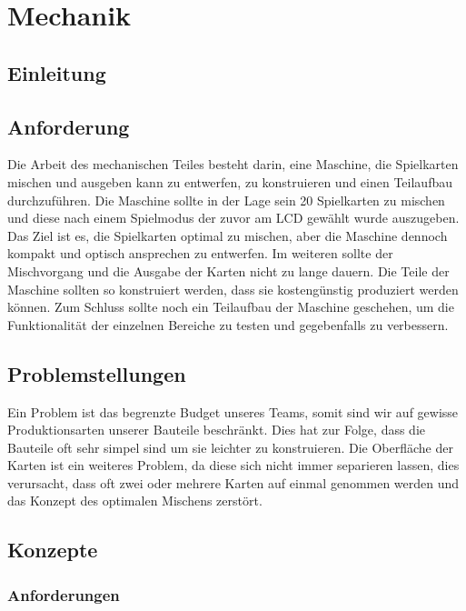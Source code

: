 \chapter{Mechanik}

\section{Einleitung}

\section{Anforderung}
\label{sec:Anforderung}
Die Arbeit des mechanischen Teiles besteht darin, eine Maschine,
die Spielkarten mischen und ausgeben kann zu entwerfen, zu konstruieren
und einen Teilaufbau durchzuführen. Die Maschine sollte in der Lage
sein 20 Spielkarten zu mischen und diese nach einem Spielmodus der
zuvor am LCD gewählt wurde auszugeben. Das Ziel ist es, die Spielkarten
optimal zu mischen, aber die Maschine dennoch kompakt und optisch
ansprechen zu entwerfen. Im weiteren sollte der Mischvorgang und die
Ausgabe der Karten nicht zu lange dauern. Die Teile der Maschine
sollten so konstruiert werden, dass sie kostengünstig produziert
werden können. Zum Schluss sollte noch ein Teilaufbau der Maschine
geschehen, um die Funktionalität der einzelnen Bereiche zu testen
und gegebenfalls zu verbessern.

\section{Problemstellungen}
Ein Problem ist das begrenzte Budget unseres Teams, somit sind
wir auf gewisse Produktionsarten unserer Bauteile beschränkt.
Dies hat zur Folge, dass die Bauteile oft sehr simpel sind um
sie leichter zu konstruieren. Die Oberfläche der Karten ist ein
weiteres Problem, da diese sich nicht immer separieren lassen, dies
verursacht, dass oft zwei oder mehrere Karten auf einmal genommen
werden und das Konzept des optimalen Mischens zerstört.

\section{Konzepte}

\subsection{Anforderungen}

